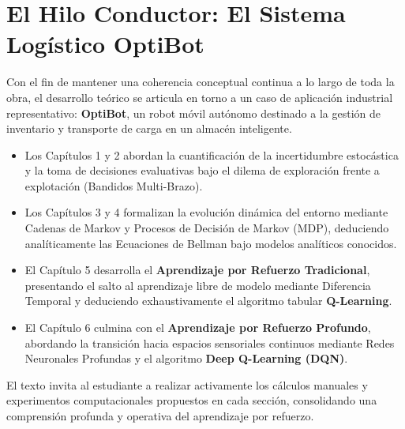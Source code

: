 \documentclass[11pt,a4paper]{report}
\begin{document}
\section*{El Hilo Conductor: El Sistema Logístico OptiBot}
Con el fin de mantener una coherencia conceptual continua a lo largo de toda la obra, el desarrollo teórico se articula en torno a un caso de aplicación industrial representativo: \textbf{OptiBot}, un robot móvil autónomo destinado a la gestión de inventario y transporte de carga en un almacén inteligente.
\begin{itemize}
  \item Los Capítulos 1 y 2 abordan la cuantificación de la incertidumbre estocástica y la toma de decisiones evaluativas bajo el dilema de exploración frente a explotación (Bandidos Multi-Brazo).
  \item Los Capítulos 3 y 4 formalizan la evolución dinámica del entorno mediante Cadenas de Markov y Procesos de Decisión de Markov (MDP), deduciendo analíticamente las Ecuaciones de Bellman bajo modelos analíticos conocidos.
  \item El Capítulo 5 desarrolla el \textbf{Aprendizaje por Refuerzo Tradicional}, presentando el salto al aprendizaje libre de modelo mediante Diferencia Temporal y deduciendo exhaustivamente el algoritmo tabular \textbf{Q-Learning}.
  \item El Capítulo 6 culmina con el \textbf{Aprendizaje por Refuerzo Profundo}, abordando la transición hacia espacios sensoriales continuos mediante Redes Neuronales Profundas y el algoritmo \textbf{Deep Q-Learning (DQN)}.
\end{itemize}

El texto invita al estudiante a realizar activamente los cálculos manuales y experimentos computacionales propuestos en cada sección, consolidando una comprensión profunda y operativa del aprendizaje por refuerzo.

\newpage
\tableofcontents
\newpage







\end{document}
